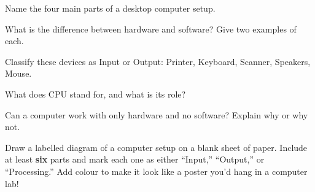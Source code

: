
\begin{reviewqs}
  \item Name the four main parts of a desktop computer setup.
  \item What is the difference between hardware and software? Give two examples of each.
  \item Classify these devices as Input or Output: Printer, Keyboard, Scanner, Speakers, Mouse.
  \item What does CPU stand for, and what is its role?
  \item Can a computer work with only hardware and no software? Explain why or why not.
\end{reviewqs}

\begin{challenge}
Draw a labelled diagram of a computer setup on a blank sheet of paper. Include at least \textbf{six} parts and mark each one as either ``Input,'' ``Output,'' or ``Processing.'' Add colour to make it look like a poster you'd hang in a computer lab!
\end{challenge}

